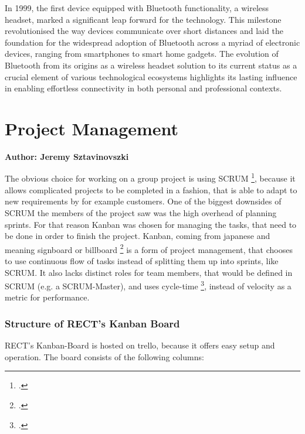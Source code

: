 In 1999, the first device equipped with Bluetooth functionality, a wireless headset, marked a significant leap forward for the technology. This milestone 
revolutionised the way devices communicate over short distances and laid the foundation for the widespread adoption of Bluetooth across a myriad of electronic 
devices, ranging from smartphones to smart home gadgets. The evolution of Bluetooth from its origins as a wireless headset solution to its current status as a 
crucial element of various technological ecosystems highlights its lasting influence in enabling effortless connectivity in both personal and professional contexts.

\section{Project Management}
\textbf{Author: Jeremy Sztavinovszki}


The obvious choice for working on a group project is using SCRUM \footcite{what-is-scrum}, because it allows complicated projects to be completed in a fashion, 
that is able to adapt to new requirements by for example customers. One of the biggest downsides of SCRUM the members of the project saw was the high overhead of planning sprints. 
For that reason Kanban was chosen for managing the tasks, that need to be done in order to finish the project. Kanban, coming from japanese and meaning signboard or billboard 
\footcite{what-is-kanban} is a form of project management, that chooses to use continuous flow of tasks instead of splitting them up into sprints, like SCRUM. 
It also lacks distinct roles for team members, that would be defined in SCRUM (e.g. a SCRUM-Master), and uses cycle-time \footcite{cycle-time-lead-time},
instead of velocity as a metric for performance. 

\subsubsection{Structure of RECT's Kanban Board}
RECT's Kanban-Board is hosted on trello, because it offers easy setup and operation. The board consists of the following columns:

